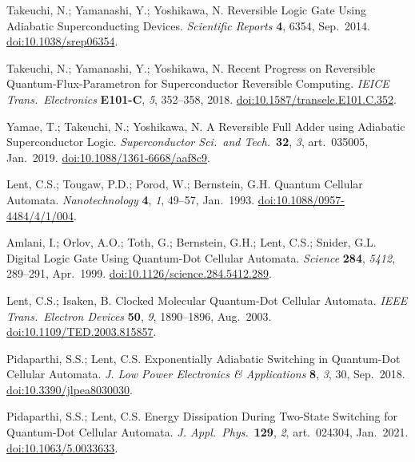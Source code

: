 \documentclass[preprints,article,accept,moreauthors,pdftex]{Definitions/mdpi}
\begin{document}
\begin{thebibliography}{999}
Takeuchi, N.; Yamanashi, Y.; Yoshikawa, N\@. Reversible Logic Gate Using Adiabatic Superconducting Devices. {\em Scientific Reports} {\bf 4}, 6354, Sep.\ 2014. \href{https://doi.org/10.1038/srep06354}{doi:10.1038/srep06354}.

Takeuchi, N.; Yamanashi, Y.; Yoshikawa, N\@. Recent Progress on Reversible Quantum-Flux-Parametron for Superconductor Reversible Computing. {\em IEICE Trans.\ Electronics} {\bf E101-C}, {\em 5}, 352--358, 2018. \href{https://doi.org/10.1587/transele.E101.C.352}{doi:10.1587/transele.E101.C.352}.

Yamae, T.; Takeuchi, N.; Yoshikawa, N\@. A Reversible Full Adder using Adiabatic Superconductor Logic. {\em Superconductor Sci.\ and Tech.}\ {\bf 32}, {\em 3}, art.\ 035005, Jan.\ 2019. \href{https://doi.org/10.1088/1361-6668/aaf8c9}{doi:10.1088/1361-6668/aaf8c9}.

Lent, C.S.; Tougaw, P.D.; Porod, W.; Bernstein, G.H\@. Quantum Cellular Automata. {\em Nanotechnology} {\bf 4}, {\em 1}, 49--57, Jan.\ 1993. \href{https://doi.org/10.1088/0957-4484/4/1/004}{doi:10.1088/0957-4484/4/1/004}.

Amlani, I.; Orlov, A.O.; Toth, G.; Bernstein, G.H.; Lent, C.S.; Snider, G.L\@. Digital Logic Gate Using Quantum-Dot Cellular Automata. {\em Science} {\bf 284}, {\em 5412}, 289--291, Apr.\ 1999. \href{https://doi.org/10.1126/science.284.5412.289}{doi:10.1126/science.284.5412.289}.

Lent, C.S.; Isaken, B\@. Clocked Molecular Quantum-Dot Cellular Automata. {\em IEEE Trans.\ Electron Devices} {\bf 50}, {\em 9}, 1890--1896, Aug.\ 2003. \href{https://doi.org/10.1109/TED.2003.815857}{doi:10.1109/TED.2003.815857}.

Pidaparthi, S.S.; Lent, C.S\@. Exponentially Adiabatic Switching in Quantum-Dot Cellular Automata. {\em J. Low Power Electronics \& Applications} {\bf 8}, {\em 3}, 30, Sep.\ 2018. \href{https://doi.org/10.3390/jlpea8030030}{doi:10.3390/jlpea8030030}.

Pidaparthi, S.S.; Lent, C.S\@. Energy Dissipation During Two-State Switching for Quantum-Dot Cellular Automata. {\em J. Appl.\ Phys.}\ {\bf 129}, {\em 2}, art.\ 024304, Jan.\ 2021. \href{https://doi.org/10.1063/5.0033633}{doi:10.1063/5.0033633}.


\end{thebibliography}
\end{document}
